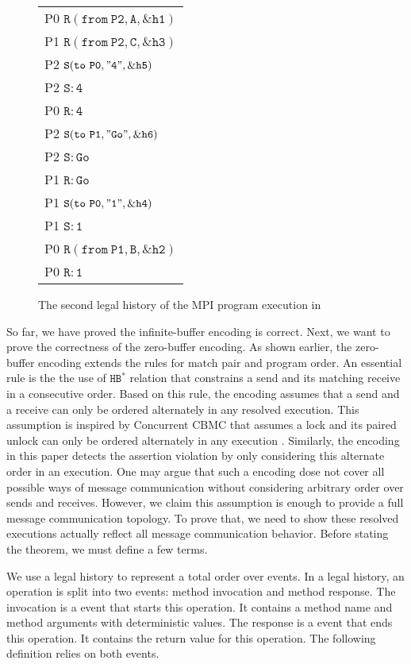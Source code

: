 \begin{figure}[h2]
\begin{center}
\setlength{\tabcolsep}{2pt}
\small \begin{tabular}[t]{l}
P0 $\mathtt{R(from\ P2, A, \&h1)}$ \\
P1 $\mathtt{R(from\ P2, C, \&h3)}$ \\
P2 $\mathtt{S(to\ P0, "4", \&h5)}$ \\
P2 $\mathtt{S: 4}$\\
P0 $\mathtt{R: 4}$ \\
P2 $\mathtt{S(to\ P1, "Go", \&h6)}$ \\
P2 $\mathtt{S: Go}$ \\
P1 $\mathtt{R: Go}$ \\
P1 $\mathtt{S(to\ P0, "1", \&h4)}$ \\
P1 $\mathtt{S: 1}$ \\
P0 $\mathtt{R(from\ P1, B, \&h2)}$ \\
P0 $\mathtt{R: 1}$ \\
\end{tabular}
\end{center}
\caption{The second legal history of the MPI program execution in }
\label{fig:history}
\end{figure}

So far, we have proved the infinite-buffer encoding is correct. Next, we want to prove the correctness of the zero-buffer encoding. As shown earlier, the zero-buffer encoding extends the rules for match pair and program order. An essential rule is the the use of $\mathtt{HB^*}$ relation that constrains a send and its matching receive in a consecutive order. Based on this rule, the encoding assumes that a send and a receive can only be ordered alternately in any resolved execution. This assumption is inspired by Concurrent CBMC that assumes a lock and its paired unlock can only be ordered alternately in any execution \cite{}. Similarly, the encoding in this paper detects the assertion violation by only considering this alternate order in an execution. One may argue that such a encoding dose not cover all possible ways of message communication without considering arbitrary order over sends and receives. However, we claim this assumption is enough to provide a full message communication topology. To prove that, we need to show these resolved executions actually reflect all message communication behavior. Before stating the theorem, we must define a few terms.

We use a legal history to represent a total order over events. In a legal history, an operation is split into two events: method invocation and method response. The invocation is a event that starts this operation. It contains a method name and method arguments with deterministic values. The response is a event that ends this operation. It contains the return value for this operation. The following definition relies on both events.


